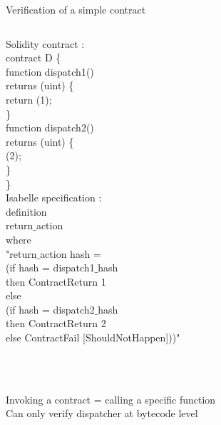 \documentclass{beamer}
\begin{document}
\begin{frame}{Verification of a simple contract}
		\footnotesize
	\begin{columns}[c]
		Solidity contract :\\
		\ttfamily
		\textcolor{Data61 ocean blue}{contract} D \{ \\
		\quad	\textcolor{Data61 ocean blue}{function} dispatch1()\\
		\quad	\textcolor{Data61 ocean blue}{returns} (\textcolor{Data61 midnight blue}{uint}) \{\\
		\quad\quad	return (1);\\
		\quad	\}\\
		\quad	\textcolor{Data61 ocean blue}{function} dispatch2()\\
		\quad	\textcolor{Data61 ocean blue}{returns} (\textcolor{Data61 midnight blue}{uint}) \{\\
		\quad{} (2);\\
		\quad	\}\\
		\}\\
		
		Isabelle specification :\\
		\ttfamily
		\textcolor{Data61 dark mint}{definition}\\
		\quad return$\_$action\\
		\textcolor{Data61 dark mint}{where}\\
		"return$\_$action hash = \\
		(\textcolor{Data61 dark mint}{if} hash = dispatch1$\_$hash\\
		\textcolor{Data61 dark mint}{then} ContractReturn 1\\
		\textcolor{Data61 dark mint}{else}\\
		(\textcolor{Data61 dark mint}{if} hash = dispatch2$\_$hash\\
		\textcolor{Data61 dark mint}{then} ContractReturn 2\\
		\textcolor{Data61 dark mint}{else} ContractFail [ShouldNotHappen]))"
	\end{columns}
~\\~\\
Invoking a contract = calling a specific function\\
Can only verify dispatcher at bytecode level
\end{frame}
\end{document}
